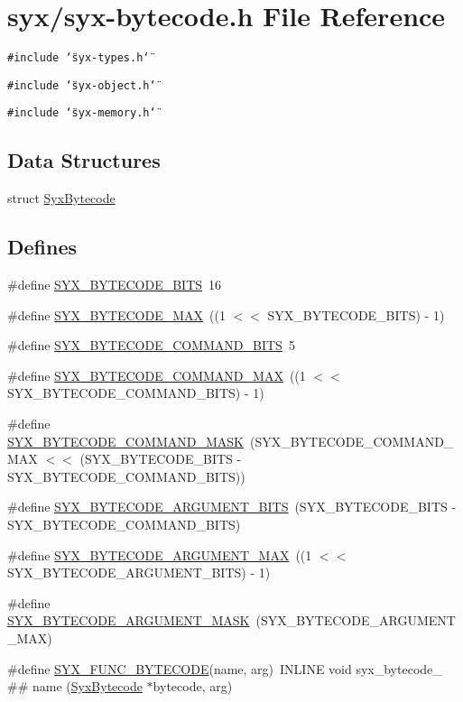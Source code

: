 \hypertarget{syx-bytecode_8h}{
\section{syx/syx-bytecode.h File Reference}
\label{syx-bytecode_8h}
}
{\tt \#include \char`\"{}syx-types.h\char`\"{}}\par
{\tt \#include \char`\"{}syx-object.h\char`\"{}}\par
{\tt \#include \char`\"{}syx-memory.h\char`\"{}}\par
\subsection*{Data Structures}
\begin{CompactItemize}
\item 
struct \hyperlink{struct_syx_bytecode}{SyxBytecode}
\end{CompactItemize}
\subsection*{Defines}
\begin{CompactItemize}
\item 
\#define \hyperlink{syx-bytecode_8h_f8aefeca70ebc9c5d4833644b92e4d00}{SYX\_\-BYTECODE\_\-BITS}~16
\item 
\#define \hyperlink{syx-bytecode_8h_f343d91f1534f8a23d607daea1c345c5}{SYX\_\-BYTECODE\_\-MAX}~((1 $<$$<$ SYX\_\-BYTECODE\_\-BITS) - 1)
\item 
\#define \hyperlink{syx-bytecode_8h_7bd85efbfd4cd98e34446ca7ab1369ee}{SYX\_\-BYTECODE\_\-COMMAND\_\-BITS}~5
\item 
\#define \hyperlink{syx-bytecode_8h_8fc4c49360ef9a755b02bf82693b45dd}{SYX\_\-BYTECODE\_\-COMMAND\_\-MAX}~((1 $<$$<$ SYX\_\-BYTECODE\_\-COMMAND\_\-BITS) - 1)
\item 
\#define \hyperlink{syx-bytecode_8h_ce0a31c234c06b8e49fc61c5ce4ef9ed}{SYX\_\-BYTECODE\_\-COMMAND\_\-MASK}~(SYX\_\-BYTECODE\_\-COMMAND\_\-MAX $<$$<$ (SYX\_\-BYTECODE\_\-BITS - SYX\_\-BYTECODE\_\-COMMAND\_\-BITS))
\item 
\#define \hyperlink{syx-bytecode_8h_a30b8b0de5a0088b12f90cbe95ab59c1}{SYX\_\-BYTECODE\_\-ARGUMENT\_\-BITS}~(SYX\_\-BYTECODE\_\-BITS - SYX\_\-BYTECODE\_\-COMMAND\_\-BITS)
\item 
\#define \hyperlink{syx-bytecode_8h_9e9106c938b74972a023d9035368f3e6}{SYX\_\-BYTECODE\_\-ARGUMENT\_\-MAX}~((1 $<$$<$ SYX\_\-BYTECODE\_\-ARGUMENT\_\-BITS) - 1)
\item 
\#define \hyperlink{syx-bytecode_8h_a7d9adeaec378162bd06f516142722e4}{SYX\_\-BYTECODE\_\-ARGUMENT\_\-MASK}~(SYX\_\-BYTECODE\_\-ARGUMENT\_\-MAX)
\item 
\#define \hyperlink{syx-bytecode_8h_70a15bed0a327462ec2fc007522c8cae}{SYX\_\-FUNC\_\-BYTECODE}(name, arg)~INLINE void syx\_\-bytecode\_\- \#\# name (\hyperlink{struct_syx_bytecode}{SyxBytecode} $\ast$bytecode, arg)
\end{CompactItemize}
